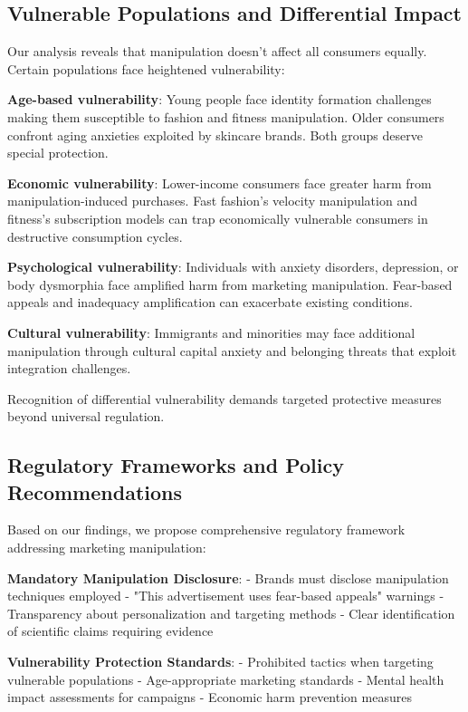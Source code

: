 \subsection{Vulnerable Populations and Differential Impact}

Our analysis reveals that manipulation doesn't affect all consumers equally. Certain populations face heightened vulnerability:

\textbf{Age-based vulnerability}: Young people face identity formation challenges making them susceptible to fashion and fitness manipulation. Older consumers confront aging anxieties exploited by skincare brands. Both groups deserve special protection.

\textbf{Economic vulnerability}: Lower-income consumers face greater harm from manipulation-induced purchases. Fast fashion's velocity manipulation and fitness's subscription models can trap economically vulnerable consumers in destructive consumption cycles.

\textbf{Psychological vulnerability}: Individuals with anxiety disorders, depression, or body dysmorphia face amplified harm from marketing manipulation. Fear-based appeals and inadequacy amplification can exacerbate existing conditions.

\textbf{Cultural vulnerability}: Immigrants and minorities may face additional manipulation through cultural capital anxiety and belonging threats that exploit integration challenges.

Recognition of differential vulnerability demands targeted protective measures beyond universal regulation.

\subsection{Regulatory Frameworks and Policy Recommendations}

Based on our findings, we propose comprehensive regulatory framework addressing marketing manipulation:

\textbf{Mandatory Manipulation Disclosure}:
- Brands must disclose manipulation techniques employed
- "This advertisement uses fear-based appeals" warnings
- Transparency about personalization and targeting methods
- Clear identification of scientific claims requiring evidence

\textbf{Vulnerability Protection Standards}:
- Prohibited tactics when targeting vulnerable populations
- Age-appropriate marketing standards
- Mental health impact assessments for campaigns
- Economic harm prevention measures

